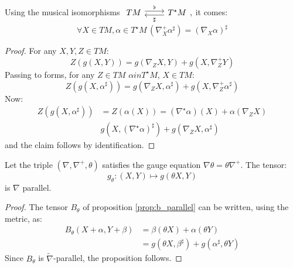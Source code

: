 \begin{prop}
Using the musical isomorphisms 
    $
    \begin{tikzcd}
    TM \ar[r,shift left, "\flat"] & T^\star M \ar[l,shift left, "\sharp"]
    \end{tikzcd}
    ,$
it comes:
\[
\forall X\in TM,\alpha \in T^\star M \, \left(\nabla^+_X \alpha^\sharp \right) = \left(
\nabla_X \alpha\right)^\sharp
\]
\end{prop}
\begin{proof}
For any $X,Y,Z \in TM$:
\[
Z \left( g(X,Y) \right) = g\left( \nabla_Z X, Y \right) +
g\left( X, \nabla^+_Z Y \right)
\]
Passing to forms, for any $Z \in TM$ $\alpha in T^\star M$, $ X \in TM$:
\[
Z \left( g(X, \alpha^\sharp) \right) = g\left( \nabla_Z X, \alpha^\sharp \right) +
g\left( X, \nabla^+_Z \alpha^\sharp \right)
\]
Now:
\[
\begin{split}
Z \left( g(X, \alpha^\sharp) \right) & = Z \left(\alpha(X)\right) = 
\left(\nabla^\star \alpha \right)(X) + \alpha \left( \nabla_Z X\right) \\
&  g\left(X,\left(\nabla^\star \alpha\right)^\sharp\right) +
g \left(\nabla_Z X , \alpha^\sharp \right)
\end{split}
\]
and the claim follows by identification.
\end{proof}
\begin{rem}
    
\end{rem}
\begin{prop}
\label{prop:parallel_g_tensor}
Let the triple $\left(\nabla,\nabla^+,\theta \right)$ satisfies the gauge equation $\nabla \theta = \theta \nabla^+.$ The tensor:
\begin{equation}
    \label{eq:parallel_g_tensor}
    g_\theta \colon (X,Y) \mapsto g\left( \theta X, Y\right)
\end{equation}
is $\nabla$ parallel.
\end{prop}
\begin{proof}
    The tensor $B_\theta$ of proposition \ref{prop:b_parallel} can be written, using the metric, as:
    \begin{align}
        B_\theta\left( X+ \alpha, Y + \beta \right) &= \beta(\theta X) + \alpha(\theta Y) \\
        & = g \left( \theta X, \beta^\sharp \right) + g \left( \alpha^\sharp , \theta Y \right)
    \end{align}
    Since $B_\theta$ is $\tilde{\nabla}$-parallel, the proposition follows.
\end{proof}
